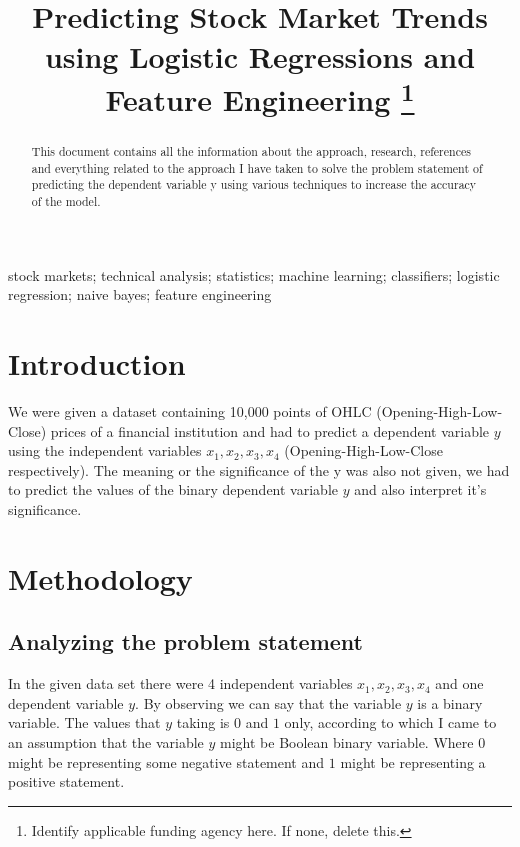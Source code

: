 \documentclass[conference]{IEEEtran}
\begin{document}
\title{\\ Predicting Stock Market Trends using Logistic Regressions and Feature Engineering
\thanks{Identify applicable funding agency here. If none, delete this.}
}

\author{
}

\maketitle

\begin{abstract}
This document contains all the information about the approach, research, references and everything related to the approach I have taken to solve the problem statement of predicting the dependent variable y using various techniques to increase the accuracy of the model.
\end{abstract}

\begin{IEEEkeywords}
stock markets; technical analysis; statistics; machine learning; classifiers; logistic regression; naive bayes; feature engineering
\end{IEEEkeywords}

\section{Introduction}
We were given a dataset containing 10,000 points of OHLC (Opening-High-Low-Close) prices of a financial institution and had to predict a dependent variable $y$ using the independent variables $x_{1}, x_{2}, x_{3}, x_{4}$ (Opening-High-Low-Close respectively). The meaning or the significance of the y was also not given, we had to predict the values of the binary dependent variable $y$ and also interpret it's significance.

\section{Methodology}

\subsection{Analyzing the problem statement}
In the given data set there were 4 independent variables $x_{1}, x_{2}, x_{3}, x_{4}$ and one dependent variable $y$. By observing we can say that the variable $y$ is a binary variable. The values that $y$ taking is $0$ and $1$ only, according to which I came to an assumption that the variable $y$ might be Boolean binary variable. Where $0$ might be representing some negative statement and $1$ might be representing a positive statement.
\end{document}
